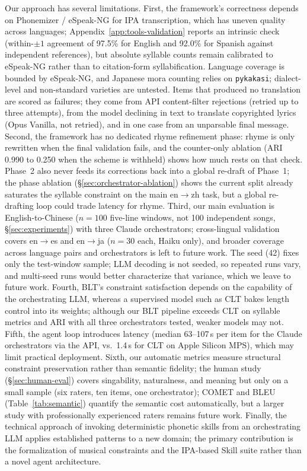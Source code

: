 \documentclass[11pt]{article}
\begin{document}
Our approach has several limitations.
First, the framework's correctness depends on Phonemizer / eSpeak-NG for IPA transcription, which has uneven quality across languages; Appendix~\ref{app:tools-validation} reports an intrinsic check (within-$\pm1$ agreement of 97.5\% for English and 92.0\% for Spanish against independent references), but absolute syllable counts remain calibrated to eSpeak-NG rather than to citation-form syllabification. Language coverage is bounded by eSpeak-NG, and Japanese mora counting relies on \texttt{pykakasi}; dialect-level and non-standard varieties are untested. Items that produced no translation are scored as failures; they come from API content-filter rejections (retried up to three attempts), from the model declining in text to translate copyrighted lyrics (Opus Vanilla, not retried), and in one case from an unparsable final message.
Second, the framework has no dedicated rhyme refinement phase: rhyme is only rewritten when the final validation fails, and the counter-only ablation (ARI 0.990 to 0.250 when the scheme is withheld) shows how much rests on that check. Phase~2 also never feeds its corrections back into a global re-draft of Phase~1; the phase ablation (\S\ref{sec:orchestrator-ablation}) shows the current split already saturates the syllable constraint on the main en$\rightarrow$zh task, but a global re-drafting loop could trade latency for rhyme.
Third, our main evaluation is English-to-Chinese ($n{=}100$ five-line windows, not 100 independent songs, \S\ref{sec:experiments}) with three Claude orchestrators; cross-lingual validation covers en$\rightarrow$es and en$\rightarrow$ja ($n{=}30$ each, Haiku only), and broader coverage across language pairs and orchestrators is left to future work.
The seed (42) fixes only the test-window sample; LLM decoding is not seeded, so repeated runs vary, and multi-seed runs would better characterize that variance, which we leave to future work.
Fourth, BLT's constraint satisfaction depends on the capability of the orchestrating LLM, whereas a supervised model such as CLT bakes length control into its weights; although our BLT pipeline exceeds CLT on syllable metrics and ARI with all three orchestrators tested, weaker models may not.
Fifth, the agent loop introduces latency (median 63--107\,s per item for the Claude orchestrators via the API, vs.\ 1.4\,s for CLT on Apple Silicon MPS), which may limit practical deployment.
Sixth, our automatic metrics measure structural constraint preservation rather than semantic fidelity; the human study (\S\ref{sec:human-eval}) covers singability, naturalness, and meaning but only on a small sample (six raters, ten items, one orchestrator); COMET and BLEU (Table~\ref{tab:semantic}) quantify the semantic cost automatically, but a larger study with professionally experienced raters remains future work.
Finally, the technical approach of invoking deterministic phonetic skills from an orchestrating LLM applies established patterns \citep{yao-etal-2023-react,gao-etal-2023-pal,schick-etal-2023-toolformer} to a new domain; the primary contribution is the formalization of musical constraints and the IPA-based Skill suite rather than a novel agent architecture.
\end{document}
